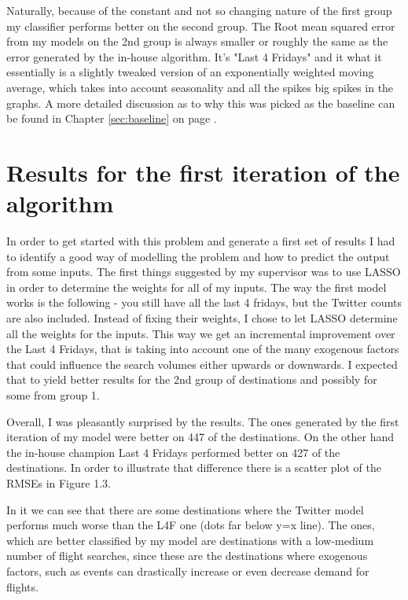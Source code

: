 \documentclass[minf,frontabs,twoside,singlespacing,parskip]{infthesis}
\begin{document}
Naturally, because of the constant and not so changing nature of the first group my classifier performs better on the second group. The Root mean squared error from my models on the 2nd group is always smaller or roughly the same as the error generated by the in-house algorithm. It's  "Last 4 Fridays" and it what it essentially is a slightly tweaked version of an exponentially weighted moving average, which takes into account seasonality and all the spikes big spikes in the graphs. A more detailed discussion as to why this was picked as the baseline can be found in Chapter \ref{sec:baseline} on page \pageref{sec:baseline}.

\section{Results for the first iteration of the algorithm}

In order to get started with this problem and generate a first set of results I had to identify a good way of modelling the problem and how to predict the output from some inputs. The first things suggested by my supervisor was to use LASSO \cite{lasso} in order to determine the weights for all of my inputs. The way the first model works is the following - you still have all the last 4 fridays, but the Twitter counts are also included. Instead of fixing their weights, I chose to let LASSO determine all the weights for the inputs. This way we get an incremental improvement over the Last 4 Fridays, that is taking into account one of the many exogenous factors that could influence the search volumes either upwards or downwards. I expected that to yield better results for the 2nd group of destinations and possibly for some from group 1.

Overall, I was pleasantly surprised by the results. The ones generated by the first iteration of my model were better on 447 of the destinations. On the other hand the in-house champion Last 4 Fridays performed better on 427 of the destinations. In order to illustrate that difference there is a scatter plot of the RMSEs in Figure 1.3.


In it we can see that there are some destinations where the Twitter model performs much worse than the L4F one (dots far below y=x line). The ones, which are better classified by my model are destinations with a low-medium number of flight searches, since these are the destinations where exogenous factors, such as events can drastically increase or even decrease demand for flights.
\end{document}

